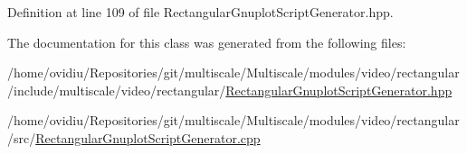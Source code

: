 Definition at line 109 of file Rectangular\-Gnuplot\-Script\-Generator.\-hpp.



The documentation for this class was generated from the following files\-:\begin{DoxyCompactItemize}
\item 
/home/ovidiu/\-Repositories/git/multiscale/\-Multiscale/modules/video/rectangular/include/multiscale/video/rectangular/\hyperlink{RectangularGnuplotScriptGenerator_8hpp}{Rectangular\-Gnuplot\-Script\-Generator.\-hpp}\item 
/home/ovidiu/\-Repositories/git/multiscale/\-Multiscale/modules/video/rectangular/src/\hyperlink{RectangularGnuplotScriptGenerator_8cpp}{Rectangular\-Gnuplot\-Script\-Generator.\-cpp}\end{DoxyCompactItemize}
